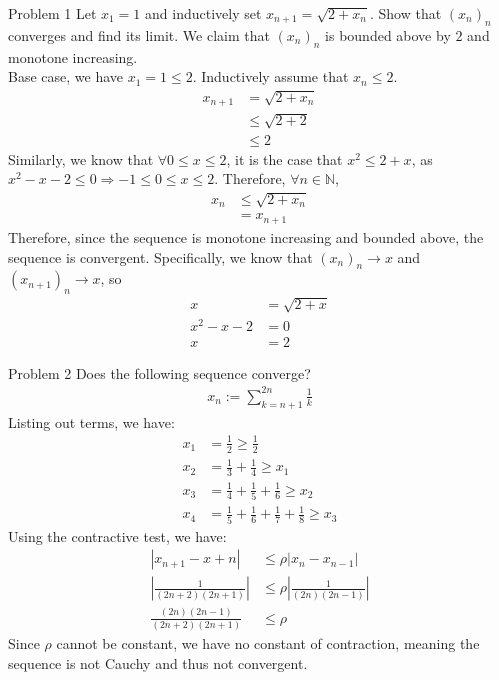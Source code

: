 \documentclass[10pt]{extarticle}
\title{}
\author{Avinash Iyer}
\date{}
\newcommand{\N}{\mathbb{N}}
\begin{document}
  \begin{problem}{Problem 1}
    Let $x_1 = 1$ and inductively set $x_{n+1} = \sqrt{2 + x_n}$. Show that $(x_n)_n$ converges and find its limit.
    \tcblower
    We claim that $(x_n)_n$ is bounded above by $2$ and monotone increasing.\\

    Base case, we have $x_1 = 1 \leq 2$. Inductively assume that $x_n \leq 2$.
    \begin{align*}
      x_{n+1} &= \sqrt{2 + x_n}\\
              &\leq \sqrt{2 + 2}\\
              &\leq 2
    \end{align*}
    Similarly, we know that $\forall 0 \leq x \leq 2$, it is the case that $x^2 \leq 2 + x$, as $x^2 - x - 2 \leq 0 \Rightarrow -1 \leq 0 \leq x \leq 2$. Therefore, $\forall n\in\N$,
    \begin{align*}
      x_{n} &\leq \sqrt{2 + x_n}\\
            &= x_{n+1}
    \end{align*}
    Therefore, since the sequence is monotone increasing and bounded above, the sequence is convergent. Specifically, we know that $(x_{n})_n \rightarrow x$ and $(x_{n+1})_n \rightarrow x$, so
    \begin{align*}
      x &= \sqrt{2 + x}\\
      x^2 - x - 2 &= 0\\
      x &= 2
    \end{align*}
  \end{problem}
  \begin{problem}{Problem 2}
    Does the following sequence converge?
    \begin{align*}
      x_n := \sum_{k=n+1}^{2n}\frac{1}{k}
    \end{align*}
    \tcblower
    Listing out terms, we have:
    \begin{align*}
      x_1 &= \frac{1}{2} \geq \frac{1}{2}\\
      x_2 &= \frac{1}{3} + \frac{1}{4} \geq x_1\\
      x_3 &= \frac{1}{4} + \frac{1}{5} + \frac{1}{6} \geq x_2\\
      x_4 &= \frac{1}{5} + \frac{1}{6} + \frac{1}{7} + \frac{1}{8} \geq x_3
    \end{align*}
    Using the contractive test, we have:
    \begin{align*}
      \left|x_{n+1} - x+n\right| &\leq \rho \left|x_{n} - x_{n-1}\right|\\
      \left|\frac{1}{(2n+2)(2n+1)}\right| &\leq \rho \left|\frac{1}{(2n)(2n-1)}\right|\\
      \frac{(2n)(2n-1)}{(2n+2)(2n+1)} &\leq \rho
    \end{align*}
    Since $\rho$ cannot be constant, we have no constant of contraction, meaning the sequence is not Cauchy and thus not convergent.
  \end{problem}
\end{document}
